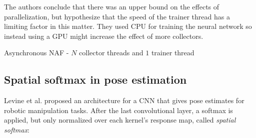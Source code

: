 The authors conclude that there was an upper bound on the effects of
parallelization, but hypothesize that the speed of the trainer thread has a
limiting factor in this matter. They used CPU for training the neural network
so instead using a GPU might increase the effect of more collectors.

\begin{algorithm}[!h]
    \caption{Asynchronous NAF - $N$ collector threads and $1$ trainer thread}
    \begin{algorithmic}
        \ENDFOR
            \ENDFOR
        \ENDFOR
    \end{algorithmic}
    \label{algo:async_naf}
\end{algorithm}

\subsection{Spatial softmax in pose estimation}

Levine et al. \cite{levine2016end} proposed an architecture for a CNN that
gives pose estimates for robotic manipulation tasks. After the last
convolutional layer, a softmax is applied, but only normalized over each
kernel's response map, called \textit{spatial softmax}:

